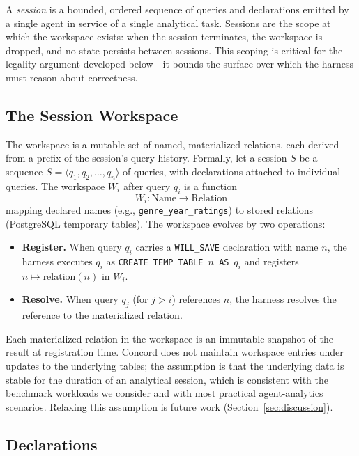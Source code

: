 A \emph{session} is a bounded, ordered sequence of queries and declarations emitted by a single agent in service of a single analytical task. Sessions are the scope at which the workspace exists: when the session terminates, the workspace is dropped, and no state persists between sessions. This scoping is critical for the legality argument developed below---it bounds the surface over which the harness must reason about correctness.

\subsection{The Session Workspace}
\label{sec:protocol:workspace}

The workspace is a mutable set of named, materialized relations, each derived from a prefix of the session's query history. Formally, let a session $S$ be a sequence $S = \langle q_1, q_2, \ldots, q_n \rangle$ of queries, with declarations attached to individual queries. The workspace $W_i$ after query $q_i$ is a function
\[
W_i : \text{Name} \to \text{Relation}
\]
mapping declared names (e.g., \texttt{genre\_year\_ratings}) to stored relations (PostgreSQL temporary tables). The workspace evolves by two operations:

\begin{itemize}
\item \textbf{Register.} When query $q_i$ carries a \texttt{WILL\_SAVE} declaration with name $n$, the harness executes $q_i$ as \texttt{CREATE TEMP TABLE $n$ AS $q_i$} and registers $n \mapsto \text{relation}(n)$ in $W_i$.
\item \textbf{Resolve.} When query $q_j$ (for $j > i$) references $n$, the harness resolves the reference to the materialized relation.
\end{itemize}

Each materialized relation in the workspace is an immutable snapshot of the result at registration time. Concord does not maintain workspace entries under updates to the underlying tables; the assumption is that the underlying data is stable for the duration of an analytical session, which is consistent with the benchmark workloads we consider and with most practical agent-analytics scenarios. Relaxing this assumption is future work (Section~\ref{sec:discussion}).

\subsection{Declarations}
\label{sec:protocol:declarations}

